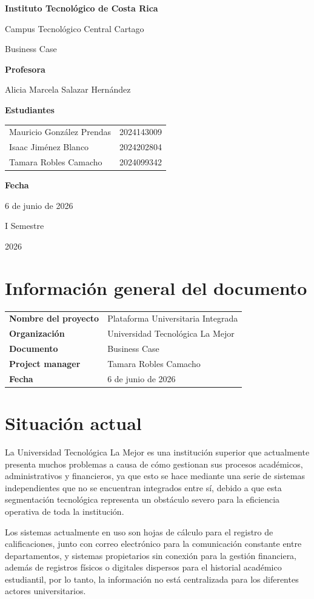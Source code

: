 \documentclass[11pt,spanish]{article}
\title{\DocumentoTitulo}
\author{\AutoresPortada}
\date{\FechaDocumento}
\makeatletter
\newcommand{\Institucion}{Instituto Tecnológico de Costa Rica}
\newcommand{\Campus}{Campus Tecnológico Central Cartago}
\newcommand{\DocumentoTitulo}{Business Case}
\newcommand{\Profesor}{Alicia Marcela Salazar Hernández}
\newcommand{\FechaDocumento}{6 de junio de 2026}
\newcommand{\PeriodoAcademico}{I Semestre}
\newcommand{\AnioDocumento}{2026}
\newcommand{\AutoresPortada}{%
    \begin{tabular}{l@{\hspace{1.5cm}}r}
        Mauricio González Prendas & 2024143009\\
        Isaac Jiménez Blanco & 2024202804\\
        Tamara Robles Camacho & 2024099342
    \end{tabular}%
}
\newcommand{\MakeCover}{%
\begin{titlepage}
\thispagestyle{empty}
\centering

{\bfseries \huge \Institucion \par}
\vspace{0.25cm}
{\LARGE \Campus \par}

\vfill

{\huge \DocumentoTitulo \par}

\vfill

{\bfseries \LARGE Profesora \par}
{\Large \Profesor \par}

\vfill

{\bfseries \LARGE Estudiantes \par}
{\Large \AutoresPortada \par}

\vfill

{\bfseries\LARGE Fecha \par}
{\Large \FechaDocumento \par}

\vfill

{\LARGE \PeriodoAcademico \par}
{\LARGE \AnioDocumento \par}

\end{titlepage}%
}
\makeatother
\begin{document}
\hypersetup{pageanchor=false}

\MakeCover

\pagestyle{empty}
\tableofcontents
\clearpage
{}
\hypersetup{pageanchor=true}
\pagestyle{fancy}

\section{Información general del documento}

\begin{table}[H]
\centering
\begin{tabularx}{\textwidth}{p{5cm} Y}
\toprule
\textbf{Nombre del proyecto} & Plataforma Universitaria Integrada \\
\textbf{Organización} & Universidad Tecnológica La Mejor \\
\textbf{Documento} & \DocumentoTitulo \\
\textbf{Project manager} & Tamara Robles Camacho \\
\textbf{Fecha} & \FechaDocumento \\
\bottomrule
\end{tabularx}
\end{table}

\section{Situación actual}

La Universidad Tecnológica La Mejor es una institución superior que actualmente presenta muchos problemas a causa de cómo gestionan sus procesos académicos, administrativos y financieros, ya que esto se hace mediante una serie de sistemas independientes que no se encuentran integrados entre sí, debido a que esta segmentación tecnológica representa un obstáculo severo para la eficiencia operativa de toda la institución.

Los sistemas actualmente en uso son hojas de cálculo para el registro de calificaciones, junto con correo electrónico para la comunicación constante entre departamentos, y sistemas propietarios sin conexión para la gestión financiera, además de registros físicos o digitales dispersos para el historial académico estudiantil, por lo tanto, la información no está centralizada para los diferentes actores universitarios.
\end{document}
